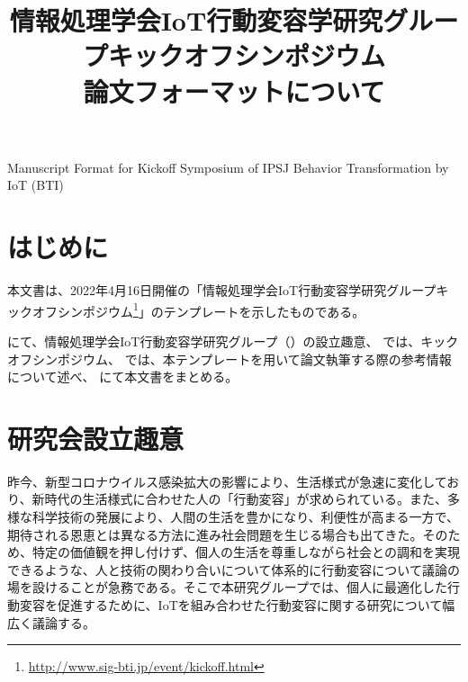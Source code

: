 \documentclass[a4paper,twocolumn,9pt]{jsarticle}
\begin{document}
\title{情報処理学会IoT行動変容学研究グループキックオフシンポジウム\\論文フォーマットについて}{Manuscript Format for Kickoff Symposium of IPSJ Behavior Transformation by IoT (BTI)}
\date{}

\maketitle
\thispagestyle{fancy}


\section{はじめに}

本文書は、2022年4月16日開催の「情報処理学会IoT行動変容学研究グループキックオフシンポジウム\footnote{\url{http://www.sig-bti.jp/event/kickoff.html}}」のテンプレートを示したものである。

にて、情報処理学会IoT行動変容学研究グループ（）の設立趣意、
では、キックオフシンポジウム、
では、本テンプレートを用いて論文執筆する際の参考情報について述べ、
にて本文書をまとめる。


\section{研究会設立趣意}
\label{sec:sigbti}

昨今、新型コロナウイルス感染拡大の影響により、生活様式が急速に変化しており、新時代の生活様式に合わせた人の「行動変容」が求められている。また、多様な科学技術の発展により、人間の生活を豊かになり、利便性が高まる一方で、期待される恩恵とは異なる方法に進み社会問題を生じる場合も出てきた。そのため、特定の価値観を押し付けず、個人の生活を尊重しながら社会との調和を実現できるような、人と技術の関わり合いについて体系的に行動変容について議論の場を設けることが急務である。そこで本研究グループでは、個人に最適化した行動変容を促進するために、IoTを組み合わせた行動変容に関する研究について幅広く議論する。
\end{document}
